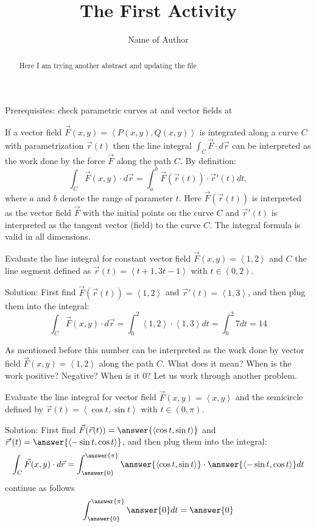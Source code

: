 \documentclass{ximera}
\title{The First Activity}
\author{Name of Author}
\begin{document}
\begin{abstract}
Here I am trying another abstract and updating the file
\end{abstract}
\maketitle
\maketitle

Prerequisites: check parametric curves at  and vector fields at 


\bigskip

If a vector field $\vec{F}(x,y)=\left<P(x,y),Q(x,y)\right>$ is integrated along a curve $C$ with parametrization $\vec{r}(t)$ then the line integral $\int_{C}\vec{F}\cdot d\vec{r}$ can be interpreted as the work done by the force $\vec{F}$ along the path $C$. By definition:
\[
\int_{C}\vec{F}(x,y)\cdot d\vec{r}=\int_{a}^{b}\vec{F}(\vec{r}(t))\cdot \vec{r}'(t)dt,
\]
where $a$ and $b$ denote the range of parameter $t$. Here $\vec{F}(\vec{r}(t))$ is interpreted as the vector field $\vec{F}$ with the initial points on the curve $C$ and $\vec{r}'(t)$ is interpreted as the tangent vector (field) to the curve $C$. The integral formula is valid in all dimensions.

\begin{example}
   Evaluate the line integral for constant vector field $\vec{F}(x,y)=\left<1,2\right>$ and $C$ the line segment defined as $\vec{r}(t)=\left<t+1,3t-1\right>$ with $t\in\left(0,2\right)$.
   
 \bigskip
 
 Solution: First find $\vec{F}(\vec{r}(t))=\left<1,2\right>$ and  $\vec{r}'(t)=\left<1,3\right>$, and then plug them into the integral:
   \[
   \int_{C}\vec{F}(x,y)\cdot d\vec{r}=\int^{2}_{0}\left<1,2\right>\cdot \left<1,3\right>dt=\int^{2}_{0}7dt=14
   \]
\end{example}

As mentioned before this number can be interpreted as the work done by vector field $\vec{F}(x,y)=\left<1,2\right>$ along the path $C$. What does it mean? When is the work positive? Negative? When is it $0$? Let us work through another problem.

\begin{problem}
 Evaluate the line integral for vector field $\vec{F}( x,y)=\left<x,y\right>$ and the semicircle defined by $\vec{r}(t)=\left<\cos t,\sin t\right>$ with $t\in\left(0,\pi\right)$.
 
\bigskip

Solution: First find $\vec{F}(\vec{r}(t))=\answer{\left< \cos t, \sin t\right>}$ and  $\vec{r}'(t)=\answer{\left<-\sin t,\cos t\right>}$, and then plug them into the integral:
\[
\int_{C}\vec{F}(x,y)\cdot d\vec{r}=\int^{\answer{\pi}}_{\answer{0}}\answer{\left< \cos t,  \sin t\right>}\cdot \answer{\left<-\sin t,\cos t\right>}dt
\]
continue as follows
\[
\int^{\answer{\pi}}_{\answer{0}}\answer{0}
dt=\answer{0}
 \]
\end{problem}
\end{document}

